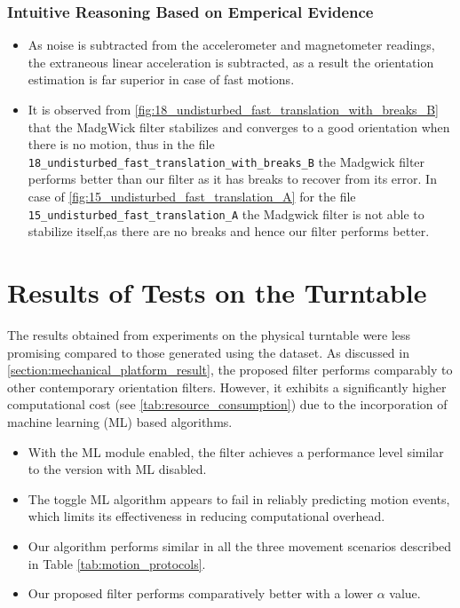 \documentclass{iutbscthesis}
\begin{document}
\subsubsection{Intuitive Reasoning Based on Emperical Evidence}

\begin{itemize}
    \item As noise is subtracted from the accelerometer and magnetometer readings, the extraneous linear acceleration is subtracted, as a 
    result the orientation estimation is far superior in case of fast motions.
    \item It is observed from \autoref{fig:18_undisturbed_fast_translation_with_breaks_B} that the MadgWick filter stabilizes and converges to a good orientation when there is no motion, thus in the file \\ \texttt{18\_undisturbed\_fast\_translation\_with\_breaks\_B} the Madgwick filter performs better than our filter as it
    has breaks to recover from its error. In case of \autoref{fig:15_undisturbed_fast_translation_A} for the file 
    \texttt{15\_undisturbed\_fast\_translation\_A} the Madgwick filter is not able to stabilize itself,as there are no breaks and hence our filter performs better.
\end{itemize}

\section{Results of Tests on the Turntable}

The results obtained from experiments on the physical turntable were less promising compared to those generated using the dataset. As discussed in \autoref{section:mechanical_platform_result}, the proposed filter performs comparably to other contemporary orientation filters. However, it exhibits a significantly higher computational cost (see \autoref{tab:resource_consumption}) due to the incorporation of machine learning (ML) based algorithms.

\begin{itemize}
    \item With the ML module enabled, the filter achieves a performance level similar to the version with ML disabled. 
    \item The toggle ML algorithm appears to fail in reliably predicting motion events, which limits its effectiveness in reducing computational overhead.
    \item Our algorithm performs similar in all the three movement scenarios described in Table \ref{tab:motion_protocols}. 
    \item Our proposed filter performs comparatively better with a lower $\alpha$ value.
\end{itemize}
\end{document}
